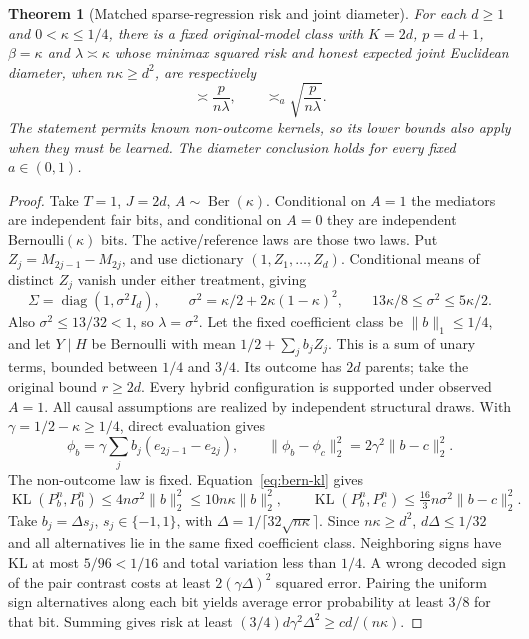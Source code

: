 \documentclass[11pt,a4paper]{article}
\numberwithin{equation}{section}
\newtheorem{theorem}{Theorem}[section]
\theoremstyle{definition}
\DeclareMathOperator{\KL}{KL}
\begin{document}
\begin{theorem}[Matched sparse-regression risk and joint diameter]\label{thm:paired}
For each $d\ge1$ and $0<\kappa\le1/4$, there is a fixed original-model
class with $K=2d$, $p=d+1$, $\beta=\kappa$ and
$\lambda\asymp\kappa$ whose minimax squared risk and honest expected
joint Euclidean diameter, when $n\kappa\ge d^2$, are respectively
\[
 \asymp\frac{p}{n\lambda},\qquad
 \asymp_a\sqrt{\frac{p}{n\lambda}}.
\]
The statement permits known non-outcome kernels, so its lower bounds
also apply when they must be learned. The diameter conclusion holds
for every fixed $a\in(0,1)$.
\end{theorem}
\begin{proof}
Take $T=1$, $J=2d$, $A\sim\operatorname{Ber}(\kappa)$. Conditional on
$A=1$ the mediators are independent fair bits, and conditional on $A=0$
they are independent Bernoulli$(\kappa)$ bits. The active/reference laws
are those two laws. Put $Z_j=M_{2j-1}-M_{2j}$, and use dictionary
$(1,Z_1,\ldots,Z_d)$. Conditional means of distinct $Z_j$ vanish under
either treatment, giving
\begin{equation}\label{eq:paired-gram}
 \Sigma=\operatorname{diag}(1,\sigma^2 I_d),\qquad
 \sigma^2=\kappa/2+2\kappa(1-\kappa)^2,\qquad
 13\kappa/8\le\sigma^2\le5\kappa/2.
\end{equation}
Also $\sigma^2\le13/32<1$, so $\lambda=\sigma^2$.
Let the fixed coefficient class be $\|b\|_1\le1/4$, and let
$Y\mid H$ be Bernoulli with mean $1/2+\sum_j b_jZ_j$.
This is a sum of unary terms, bounded between $1/4$ and $3/4$.
Its outcome has $2d$ parents; take the original bound $r\ge2d$.
Every hybrid configuration is supported under observed $A=1$.
All causal assumptions are realized by independent structural draws.
With $\gamma=1/2-\kappa\ge1/4$, direct evaluation gives
\begin{equation}\label{eq:paired-target}
 \phi_b=\gamma\sum_j b_j(e_{2j-1}-e_{2j}),\qquad
 \|\phi_b-\phi_c\|_2^2=2\gamma^2\|b-c\|_2^2.
\end{equation}
The non-outcome law is fixed. Equation~\eqref{eq:bern-kl} gives
\begin{equation}\label{eq:paired-kl}
 \KL(P_b^n,P_0^n)\le4n\sigma^2\|b\|_2^2
        \le10n\kappa\|b\|_2^2,\qquad
 \KL(P_b^n,P_c^n)\le\tfrac{16}3n\sigma^2\|b-c\|_2^2.
\end{equation}
Take $b_j=\Delta s_j$, $s_j\in\{-1,1\}$, with
$\Delta=1/\lceil32\sqrt{n\kappa}\rceil$.
Since $n\kappa\ge d^2$, $d\Delta\le1/32$ and all alternatives lie in
the same fixed coefficient class. Neighboring signs have KL at most
$5/96<1/16$ and total variation less than $1/4$. A wrong decoded sign
of the pair contrast costs at least $2(\gamma\Delta)^2$ squared error.
Pairing the uniform sign alternatives along each bit yields average
error probability at least $3/8$ for that bit. Summing gives risk at
least $(3/4)d\gamma^2\Delta^2\ge c d/(n\kappa)$.


\end{proof}
\end{document}
